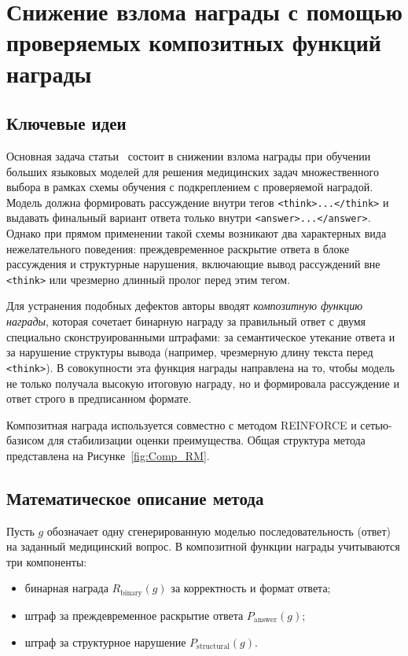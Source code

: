 \section{Снижение взлома награды с помощью проверяемых композитных функций награды}
\subsection{Ключевые идеи}

Основная задача статьи~\cite{tarek2025rewardhackingmitigationusing} 
состоит в снижении взлома награды при обучении больших языковых моделей для 
решения медицинских задач множественного выбора в рамках схемы обучения с 
подкреплением с проверяемой наградой. Модель должна формировать рассуждение 
внутри тегов \verb|<think>...</think>| и выдавать финальный вариант ответа только
внутри \verb|<answer>...</answer>|. Однако при прямом применении такой схемы 
возникают два характерных вида нежелательного поведения: преждевременное 
раскрытие ответа в блоке рассуждения и структурные нарушения, включающие 
вывод рассуждений вне \verb|<think>| или чрезмерно длинный пролог перед 
этим тегом.

Для устранения подобных дефектов авторы вводят \emph{композитную функцию награды}, 
которая сочетает бинарную награду за правильный ответ с двумя специально 
сконструированными штрафами: за семантическое утекание ответа и за нарушение 
структуры вывода (например, чрезмерную длину текста перед \verb|<think>|). 
В совокупности эта функция награды направлена на то, чтобы модель не только 
получала высокую итоговую награду, но и формировала рассуждение и ответ строго 
в предписанном формате.

Композитная награда используется совместно с методом REINFORCE и сетью-базисом 
для стабилизации оценки преимущества. Общая структура метода представлена на 
Рисунке~\ref{fig:Comp_RM}.


\subsection{Математическое описание метода}

Пусть $g$ обозначает одну сгенерированную моделью последовательность 
(ответ) на заданный медицинский вопрос. В композитной функции награды 
учитываются три компоненты:

\begin{itemize}
    \item бинарная награда $R_{\text{binary}}(g)$ за корректность и формат ответа;
    \item штраф за преждевременное раскрытие ответа $P_{\text{answer}}(g)$;
    \item штраф за структурное нарушение $P_{\text{structural}}(g)$.
\end{itemize}

